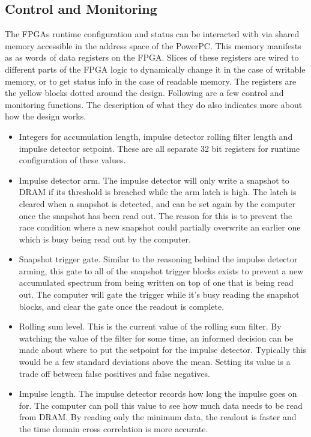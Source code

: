 \subsection{Control and Monitoring}
The FPGAs runtime configuration and status can be interacted with via shared memory accessible in the address space of the PowerPC. This memory manifests as as words of data registers on the FPGA. Slices of these registers are wired to different parts of the FPGA logic to dynamically change it in the case of writable memory, or to get status info in the case of readable memory. The registers are the yellow blocks dotted around the design. Following are a few control and monitoring functions. The description of what they do also indicates more about how the design works.
\begin{itemize}
  \item Integers for accumulation length, impulse detector rolling filter length and impulse detector setpoint. These are all separate 32 bit registers for runtime configuration of these values.
  \item Impulse detector arm. The impulse detector will only write a snapshot to DRAM if its threshold is breached while the arm latch is high. The latch is cleared when a snapshot is detected, and can be set again by the computer once the snapshot has been read out. The reason for this is to prevent the race condition where a new snapshot could partially overwrite an earlier one which is busy being read out by the computer.
  \item Snapshot trigger gate. Similar to the reasoning behind the impulse detector arming, this gate to all of the snapshot trigger blocks exists to prevent a new accumulated spectrum from being written on top of one that is being read out. The computer will gate the trigger while it's busy reading the snapshot blocks, and clear the gate once the readout is complete.
  \item Rolling sum level. This is the current value of the rolling sum filter. By watching the value of the filter for some time, an informed decision can be made about where to put the setpoint for the impulse detector. Typically this would be a few standard deviations above the mean. Setting its value is a trade off between false positives and false negatives.
  \item Impulse length. The impulse detector records how long the impulse goes on for. The computer can poll this value to see how much data needs to be read from DRAM. By reading only the minimum data, the readout is faster and the time domain cross correlation is more accurate.

\end{itemize}
